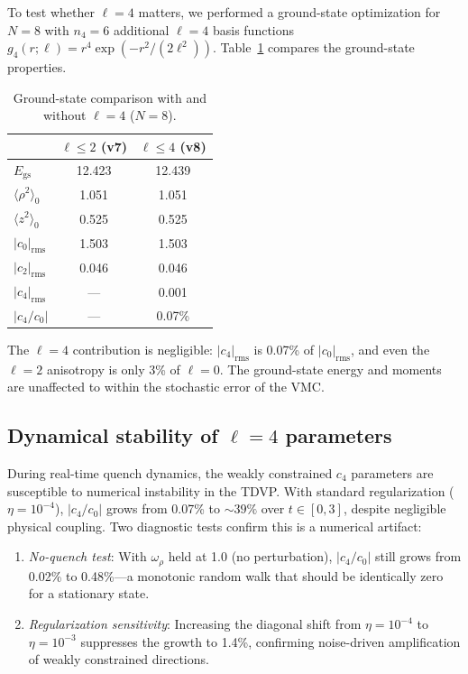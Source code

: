 \documentclass[aps,prl,onecolumn,superscriptaddress,longbibliography,nofootinbib]{revtex4-2}
\newcommand{\avg}[1]{\langle #1 \rangle}
\begin{document}
To test whether $\ell=4$ matters, we performed a ground-state
optimization for $N=8$ with $n_4=6$ additional $\ell=4$ basis functions
$g_4(r;\ell)=r^4\exp(-r^2/(2\ell^2))$.
Table~\ref{tab:l4} compares the ground-state properties.

\begin{table}[h]
\caption{Ground-state comparison with and without $\ell=4$ ($N=8$).}
\label{tab:l4}
\begin{ruledtabular}
\begin{tabular}{lcc}
 & $\ell\leq 2$ (v7) & $\ell\leq 4$ (v8) \\
\hline
$E_{\mathrm{gs}}$ & 12.423 & 12.439 \\
$\avg{\rho^2}_0$ & 1.051 & 1.051 \\
$\avg{z^2}_0$ & 0.525 & 0.525 \\
$|c_0|_{\mathrm{rms}}$ & 1.503 & 1.503 \\
$|c_2|_{\mathrm{rms}}$ & 0.046 & 0.046 \\
$|c_4|_{\mathrm{rms}}$ & --- & 0.001 \\
$|c_4/c_0|$ & --- & 0.07\% \\
\end{tabular}
\end{ruledtabular}
\end{table}

The $\ell=4$ contribution is negligible: $|c_4|_{\mathrm{rms}}$ is
0.07\% of $|c_0|_{\mathrm{rms}}$, and even the $\ell=2$ anisotropy is
only 3\% of $\ell=0$.  The ground-state energy and moments are
unaffected to within the stochastic error of the VMC.

\subsection{Dynamical stability of $\ell=4$ parameters}

During real-time quench dynamics, the weakly constrained $c_4$
parameters are susceptible to numerical instability in the TDVP.
With standard regularization ($\eta=10^{-4}$), $|c_4/c_0|$ grows
from 0.07\% to $\sim 39\%$ over $t\in[0,3]$, despite negligible
physical coupling.  Two diagnostic tests confirm this is a numerical
artifact:

\begin{enumerate}
\item \emph{No-quench test}: With $\omega_\rho$ held at 1.0 (no
perturbation), $|c_4/c_0|$ still grows from 0.02\% to 0.48\%---a
monotonic random walk that should be identically zero for a stationary
state.
\item \emph{Regularization sensitivity}: Increasing the diagonal shift
from $\eta=10^{-4}$ to $\eta=10^{-3}$ suppresses the growth to 1.4\%,
confirming noise-driven amplification of weakly constrained directions.
\end{enumerate}
\end{document}
